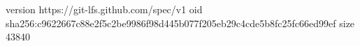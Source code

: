 version https://git-lfs.github.com/spec/v1
oid sha256:c9622667c88e2f5c2be9986f98d445b077f205eb29c4cde5b8fc25fc66ed99ef
size 43840
